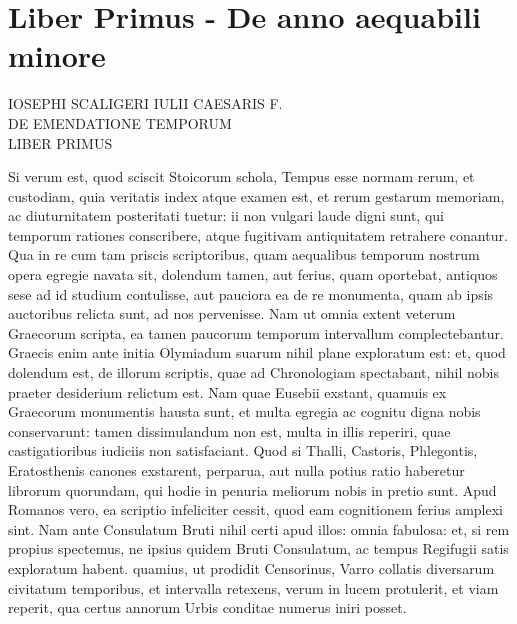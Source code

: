 

\chapter{Liber Primus - De anno aequabili minore}
\begin{center}
{\scshape
IOSEPHI SCALIGERI IULII CAESARIS F.\\
DE EMENDATIONE TEMPORUM\\
LIBER PRIMUS\\
}%
\end{center}
\normalsize

Si verum est, quod sciscit Stoicorum
schola, Tempus esse normam rerum, et
custodiam, quia veritatis index atque examen
est, et rerum gestarum memoriam, ac
diuturnitatem posteritati tuetur: ii non vulgari
laude digni sunt, qui temporum rationes
conscribere, atque fugitivam antiquitatem
retrahere conantur.
Qua in re cum
tam priscis scriptoribus, quam aequalibus
temporum nostrum opera egregie navata sit, dolendum tamen, aut
ferius, quam oportebat, antiquos sese ad id studium contulisse, aut pauciora
ea de re monumenta, quam ab ipsis auctoribus relicta sunt, ad
nos pervenisse.
Nam ut omnia extent veterum Graecorum scripta, ea
tamen paucorum temporum intervallum complectebantur.
Graecis
enim ante initia Olymiadum suarum nihil plane exploratum est: et,
quod dolendum est, de illorum scriptis, quae ad Chronologiam spectabant,
nihil nobis praeter desiderium relictum est.
Nam quae Eusebii exstant,
quamuis ex Graecorum monumentis hausta sunt, et multa egregia
ac cognitu digna nobis conservarunt: tamen dissimulandum non est,
multa in illis reperiri, quae castigatioribus iudiciis non satisfaciant.
Quod si Thalli, Castoris, Phlegontis,
 Eratosthenis canones exstarent,
perparua, aut nulla potius ratio haberetur librorum quorundam, qui
hodie in penuria meliorum nobis in pretio sunt.
Apud Romanos vero,
ea scriptio infeliciter cessit, quod eam cognitionem ferius amplexi sint.
Nam ante Consulatum Bruti nihil certi apud illos: omnia fabulosa: et,
si rem propius spectemus, ne ipsius quidem Bruti Consulatum, ac tempus
Regifugii satis exploratum habent.
quamius, ut prodidit Censorinus,
Varro collatis diversarum civitatum temporibus, et intervalla retexens,
verum in lucem protulerit, et viam reperit, qua certus
annorum Urbis conditae numerus iniri posset.

